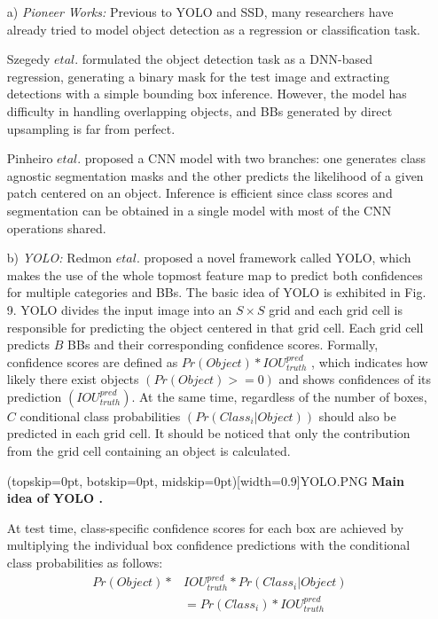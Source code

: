 \documentclass[two column]{ieeeaccess}
\begin{document}
\begin{itemize}
    \item[a)]\textit{Pioneer Works: } Previous to YOLO and SSD, many researchers have already tried to model object detection as a regression or classification task.
    
    Szegedy $et al$. \cite{118} formulated the object detection task as a DNN-based regression, generating a binary mask for the test image and extracting detections with a simple bounding box inference. However, the model has difficulty in handling overlapping objects, and BBs generated by direct upsampling is far from perfect.
    
    Pinheiro $et al$. \cite{119} proposed a CNN model with two branches: one generates class agnostic segmentation masks and the other predicts the likelihood of a given patch centered on an object. Inference is efficient since class scores and segmentation can be obtained in a single model with most of the CNN operations shared.\\
    
    \item[b)]\textit{YOLO: } Redmon $et al$. \cite{18} proposed a novel framework called YOLO, which makes the use of the whole topmost feature map to predict both confidences for multiple categories and BBs. The basic idea of YOLO is exhibited in Fig. 9. YOLO divides the input image into an $S \times S$ grid and each grid cell is responsible for predicting the object centered in that grid cell. Each grid cell predicts $B$ BBs and their corresponding confidence scores. Formally, confidence scores are defined as $Pr(Object) * IOU_{truth}^{pred}$ , which indicates how likely there exist objects $(Pr(Object) >= 0)$ and shows confidences of its prediction $(IOU_{truth}^{pred})$. At the same time, regardless of the number of boxes, $C$ conditional class probabilities $(Pr(Class_i|Object))$ should also be predicted in each grid cell. It should be noticed that only the contribution from the grid cell containing an object is calculated.
    
    \Figure[ht](topskip=0pt, botskip=0pt, midskip=0pt)[width=0.9\linewidth]{YOLO.PNG} {\textbf{Main idea of YOLO \cite{18}.}\label{fig9}}
    
    At test time, class-specific confidence scores for each box are achieved by multiplying the individual box confidence predictions with the conditional class probabilities as follows:
    \begin{equation}
    \begin{aligned}
        Pr(Object) * & IOU_{truth}^{pred} * Pr(Class_i|Object) \\
        & = Pr(Class_i) * IOU_{truth}^{pred}
    \end{aligned}
    \end{equation} \\
    

\end{itemize}
\end{document}
